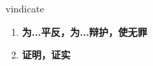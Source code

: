 
\begin{frame}
{\huge vindicate}
\begin{center}
\begin{enumerate}\Large
  \item \textbf{为...平反，为...辩护，使无罪}
  \item \textbf{证明，证实}
\end{enumerate}
\end{center}
\end{frame}
